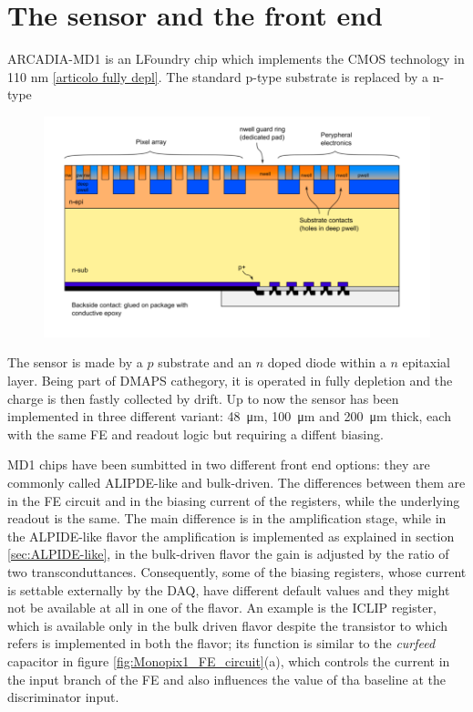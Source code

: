 \section{The sensor and the front end}
    ARCADIA-MD1 is an LFoundry chip which implements the CMOS technology in 110 nm \ref{articolo fully depl}.
    The standard p-type substrate is replaced by a n-type 
    \begin{figure}[h!]
        \centering
        \includegraphics[width=.8\linewidth]{figures/ARCADIA/sensor.png}
        \caption{}
        \label{fig:ARCADIA_substrate}
    \end{figure}

    The sensor is made by a $p$ substrate and an $n$ doped diode within a $n$ epitaxial layer. 
    Being part of DMAPS cathegory, it is operated in fully depletion and the charge is then fastly collected by drift. 
    Up to now the sensor has been implemented in three different variant: \SI{48}{\um}, \SI{100}{\um} and \SI{200}{\um} thick, each with the same FE and readout logic but requiring a diffent biasing.  

        MD1 chips have been sumbitted in two different front end options: they are commonly called ALIPDE-like and bulk-driven.  
        The differences between them are in the FE circuit and in the biasing current of the registers, while the underlying readout is the same.
        The main difference is in the amplification stage, while in the ALPIDE-like flavor the amplification is implemented as explained in section \ref{sec:ALPIDE-like}, in the bulk-driven flavor the gain is adjusted by the ratio of two transconduttances. Consequently, some of the biasing registers, whose current is settable externally by the DAQ, have different default values and they might not be available at all in one of the flavor.
        An example is the ICLIP register, which is available only in the bulk driven flavor despite the transistor to which refers is implemented in both the flavor; its function is similar to the \emph{curfeed} capacitor in figure \ref{fig:Monopix1_FE_circuit}(a), which controls the current in the input branch of the FE and also influences the value of tha baseline at the discriminator input. 
        
